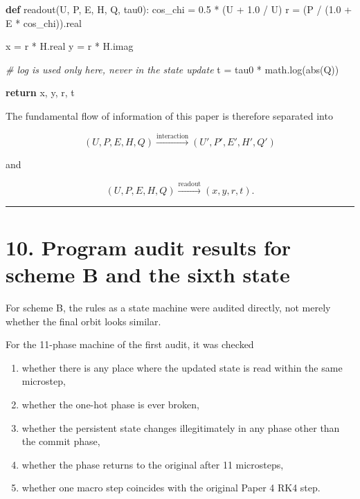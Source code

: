 \documentclass[
  a4paper,
]{article}
\newenvironment{Shaded}{}{}
\newcommand{\BuiltInTok}[1]{\textcolor[rgb]{0.00,0.50,0.00}{#1}}
\newcommand{\CommentTok}[1]{\textcolor[rgb]{0.38,0.63,0.69}{\textit{#1}}}
\newcommand{\ControlFlowTok}[1]{\textcolor[rgb]{0.00,0.44,0.13}{\textbf{#1}}}
\newcommand{\FloatTok}[1]{\textcolor[rgb]{0.25,0.63,0.44}{#1}}
\newcommand{\KeywordTok}[1]{\textcolor[rgb]{0.00,0.44,0.13}{\textbf{#1}}}
\newcommand{\NormalTok}[1]{#1}
\newcommand{\OperatorTok}[1]{\textcolor[rgb]{0.40,0.40,0.40}{#1}}
\providecommand{\tightlist}{%
  \setlength{\itemsep}{0pt}\setlength{\parskip}{0pt}}
\begin{document}
\begin{Shaded}
\begin{Highlighting}[]
\KeywordTok{def}\NormalTok{ readout(U, P, E, H, Q, tau0):}
\NormalTok{    cos\_chi }\OperatorTok{=} \FloatTok{0.5} \OperatorTok{*}\NormalTok{ (U }\OperatorTok{+} \FloatTok{1.0} \OperatorTok{/}\NormalTok{ U)}
\NormalTok{    r }\OperatorTok{=}\NormalTok{ (P }\OperatorTok{/}\NormalTok{ (}\FloatTok{1.0} \OperatorTok{+}\NormalTok{ E }\OperatorTok{*}\NormalTok{ cos\_chi)).real}

\NormalTok{    x }\OperatorTok{=}\NormalTok{ r }\OperatorTok{*}\NormalTok{ H.real}
\NormalTok{    y }\OperatorTok{=}\NormalTok{ r }\OperatorTok{*}\NormalTok{ H.imag}

    \CommentTok{\# log is used only here, never in the state update}
\NormalTok{    t }\OperatorTok{=}\NormalTok{ tau0 }\OperatorTok{*}\NormalTok{ math.log(}\BuiltInTok{abs}\NormalTok{(Q))}

    \ControlFlowTok{return}\NormalTok{ x, y, r, t}
\end{Highlighting}
\end{Shaded}

The fundamental flow of information of this paper is therefore separated
into

\[
\boxed{
(U,P,E,H,Q)
\xrightarrow{\text{interaction}}
(U',P',E',H',Q')
}
\]

and

\[
\boxed{
(U,P,E,H,Q)
\xrightarrow{\text{readout}}
(x,y,r,t).
}
\]

\begin{center}\rule{0.5\linewidth}{0.5pt}\end{center}

\section{10. Program audit results for scheme B and the sixth
state}\label{program-audit-results-for-scheme-b-and-the-sixth-state}

For scheme B, the rules as a state machine were audited directly, not
merely whether the final orbit looks similar.

For the 11-phase machine of the first audit, it was checked

\begin{enumerate}
\def\labelenumi{\arabic{enumi}.}
\tightlist
\item
  whether there is any place where the updated state is read within the
  same microstep,
\item
  whether the one-hot phase is ever broken,
\item
  whether the persistent state changes illegitimately in any phase other
  than the commit phase,
\item
  whether the phase returns to the original after 11 microsteps,
\item
  whether one macro step coincides with the original Paper 4 RK4 step.
\end{enumerate}
\end{document}

